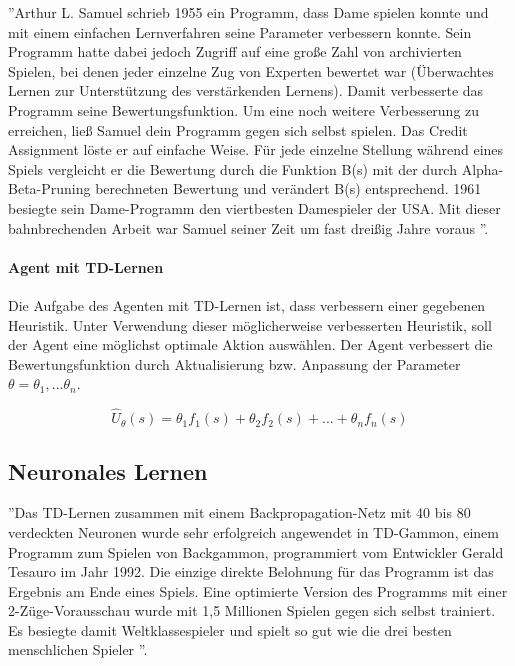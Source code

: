 ''Arthur L. Samuel schrieb 1955 ein Programm, dass Dame spielen konnte und mit einem einfachen Lernverfahren seine Parameter verbessern konnte. Sein Programm hatte dabei jedoch Zugriff auf eine große Zahl von archivierten Spielen, bei denen jeder einzelne Zug von Experten bewertet war (Überwachtes Lernen zur Unterstützung des verstärkenden Lernens). Damit verbesserte das Programm seine Bewertungsfunktion. Um eine noch weitere Verbesserung zu erreichen, ließ Samuel dein Programm gegen sich selbst spielen. Das Credit Assignment löste er auf einfache Weise. Für jede einzelne Stellung während eines Spiels vergleicht er die Bewertung durch die Funktion B(s) mit der durch Alpha-Beta-Pruning berechneten Bewertung und verändert B(s) entsprechend. 1961 besiegte sein Dame-Programm den viertbesten Damespieler der USA. Mit dieser bahnbrechenden Arbeit war Samuel seiner Zeit um fast dreißig Jahre voraus \cite[120\psq]{Ertel}''.

\paragraph{Agent mit TD-Lernen}
Die Aufgabe des Agenten mit TD-Lernen ist, dass verbessern einer gegebenen Heuristik. Unter Verwendung dieser möglicherweise verbesserten Heuristik, soll der Agent eine möglichst optimale Aktion auswählen. Der Agent verbessert die Bewertungsfunktion durch Aktualisierung bzw. Anpassung der Parameter $\theta = \theta_1, ... \theta_n$. 

\begin{equation*}
\hat{U}_\theta(s) = \theta_1 f_1(s) + \theta_2 f_2(s) + ... + \theta_n f_n(s)
\end{equation*}

\subsection{Neuronales Lernen}
\label{subsec:Neuronales Lernen}
''Das TD-Lernen zusammen mit einem Backpropagation-Netz mit 40 bis 80 verdeckten Neuronen wurde sehr erfolgreich angewendet in TD-Gammon, einem Programm zum Spielen von Backgammon, programmiert vom Entwickler Gerald Tesauro im Jahr 1992. Die einzige direkte Belohnung für das Programm ist das Ergebnis am Ende eines Spiels. Eine optimierte Version des Programms mit einer 2-Züge-Vorausschau wurde mit 1,5 Millionen Spielen gegen sich selbst trainiert. Es besiegte damit Weltklassespieler und spielt so gut wie die drei besten menschlichen Spieler \cite[304]{Ertel}''.  